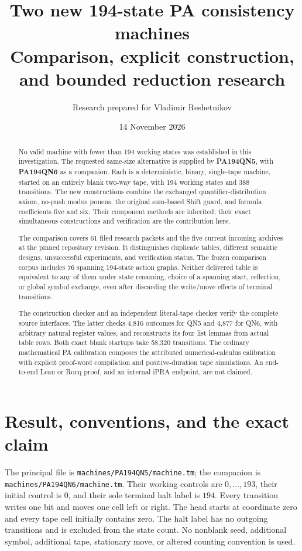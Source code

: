 \documentclass[11pt,letterpaper]{article}
\title{Two new 194-state PA consistency machines\\\large Comparison, explicit construction, and bounded reduction research}
\author{Research prepared for Vladimir Reshetnikov}
\date{14 November 2026}
\newcommand{\file}[1]{\begingroup\def\UrlBreaks{\do\/\do\_\do\-\do\.}\texttt{\nolinkurl{#1}}\endgroup}
\begin{document}
\maketitle
\begin{abstract}
No valid machine with fewer than 194 working states was established in this investigation.
The requested same-size alternative is supplied by \textbf{PA194QN5}, with
\textbf{PA194QN6} as a companion. Each is a deterministic, binary, single-tape
machine, started on an entirely blank two-way tape, with 194 working states and
388 transitions. The new constructions combine the exchanged quantifier-distribution
axiom, no-push modus ponens, the original sum-based Shift guard, and formula
coefficients five and six. Their component methods are inherited; their exact
simultaneous constructions and verification are the contribution here.

The comparison covers 61 filed research packets and the five current incoming
archives at the pinned repository revision. It distinguishes duplicate tables,
different semantic designs, unsuccessful experiments, and verification status.
The frozen comparison corpus includes 76 spanning 194-state action graphs.
Neither delivered table is equivalent to any of them under state renaming,
choice of a spanning start, reflection, or global symbol exchange, even after
discarding the write/move effects of terminal transitions.

The construction checker and an independent literal-tape checker verify the
complete source interfaces. The latter checks 4,816 outcomes for QN5 and 4,877
for QN6, with arbitrary natural register values, and reconstructs its four list
lemmas from actual table rows. Both exact blank startups take 58,320 transitions.
The ordinary mathematical PA calibration composes the attributed numerical-calculus
calibration with explicit proof-word compilation and positive-duration tape
simulations. An end-to-end Lean or Rocq proof, and an internal iPRA endpoint,
are not claimed.
\end{abstract}
\clearpage
\begingroup\small\setlength{\parskip}{0pt}
\tableofcontents
\endgroup
\clearpage

\section{Result, conventions, and the exact claim}

The principal file is \file{machines/PA194QN5/machine.tm}; the companion is
\file{machines/PA194QN6/machine.tm}. Their working controls are
$0,\ldots,193$, their initial control is $0$, and their sole terminal halt
label is $194$. Every transition writes one bit and moves one cell left or
right. The head starts at coordinate zero and every tape cell initially contains
zero. The halt label has no outgoing transitions and is excluded from the
state count. No nonblank seed, additional symbol, additional tape, stationary
move, or altered counting convention is used.
\end{document}
